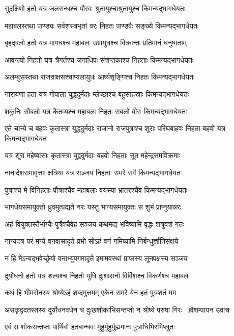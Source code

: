 \twolineshloka
{सुदक्षिणो हतो यत्र जलसन्धश्च पौरवः}
{श्रुतायुश्चाश्रुतायुश्च किमन्यद्भागधेयतः}


\twolineshloka
{महाबलस्तथा पाण्ड्यः सर्वशस्त्रभृतां वरः}
{निहतः पाण्डवैः सङ्ख्ये किमन्यद्भागधेयतः}


\twolineshloka
{बृहद्बलो हतो यत्र मागधश्च महाबलः}
{उग्रायुधश्च विक्रान्तः प्रतिमानं धनुष्मताम्}


\twolineshloka
{आवन्त्यो निहतो यत्र त्रैगर्तश्च जनाधिपः}
{संशप्तकाश्च निहताः किमन्यद्भागधेयतः}


\twolineshloka
{अलम्बुसस्तथा राजन्राक्षसश्चाप्यलायुधः}
{आर्ष्यशृङ्गिश्च निहतः किमन्यद्भागधेयतः}


\twolineshloka
{नारायणा हता यत्र गोपाला युद्धदुर्मदाः}
{म्लेच्छाश्च बहुसाहस्राः किमन्यद्भागधेयतः}


\twolineshloka
{शकुनिः सौबलो यत्र कैतव्यश्च महाबलः}
{निहतः सबलो वीरः किमन्यद्भागधेयतः}


\threelineshloka
{एते चान्ये च बहवः कृतास्त्रा युद्धदुर्मदाः}
{राजानो राजपुत्राश्च शूराः परिघबाहवः}
{निहता बहवो यत्र किमन्यद्भागधेयतः}


\twolineshloka
{यत्र शूरा महेष्वासाः कृतास्त्रा युद्वदुर्मदाः}
{बहवो निहताः सूत महेन्द्रसमविक्रमाः}


\twolineshloka
{नानादेशसमावृत्ताः क्षत्रिया यत्र सञ्जय}
{निहताः समरे सर्वे किमन्यद्भागधेयतः}


\twolineshloka
{पुत्राश्च मे विनिहताः पौत्राश्चैव महाबलाः}
{वयस्या भ्रातरश्चैव किमन्यद्भागधेयतः}


\twolineshloka
{भागधेयसमायुक्तो ध्रुवमुत्पद्यते नरः}
{यस्तु भाग्यसमायुक्तः स शुभं प्राप्नुयान्नरः}


\twolineshloka
{अहं वियुक्तस्तैर्भाग्यैः पुत्रैश्चैवेह सञ्जय}
{कथमद्य भविष्यामि वृद्धः शत्रुवशं गतः}


\twolineshloka
{नान्यदत्र परं मन्ये वनवासादृते प्रभो}
{सोऽहं वनं गमिष्यामि निर्बन्धुर्ज्ञातिसंक्षये}


\twolineshloka
{न हि मेऽन्यद्भवेच्छ्रेयो वनाभ्युपगमादृते}
{इमामवस्थां प्राप्तस्य लूनपक्षस्य सञ्जय}


\twolineshloka
{दुर्योधनो हतो यत्र शल्यश्च निहतो युधि}
{दुःशासनो विविंशश्च विकर्णश्च महाबलः}


\twolineshloka
{कथं हि भीमसेनस्य श्रोष्येऽहं शब्दमुत्तमम्}
{एकेन समरे येन हतं पुत्रशतं मम}


\threelineshloka
{असकृद्वदतस्तस्य दुर्योधनवधेन च}
{दुःखशोकाभिसन्तप्तो न श्रोष्ये परुषा गिरः ॥वैशम्पायन उवाच}
{}


\twolineshloka
{एवं स शोकसन्तप्तः पार्थिवो हतबान्धवः}
{मुहुर्मुहुर्मुह्यमानः पुत्राधिभिरभिप्लुतः}


